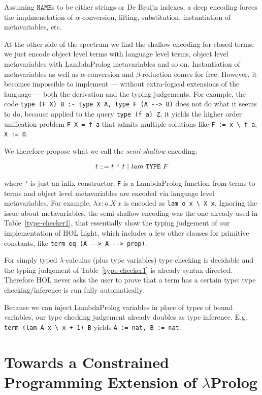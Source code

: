 \documentclass[preprint]{sigplanconf}
\begin{document}
Assuming $\mathtt{NAME}$s to be either strings or De Bruijn indexes, a deep encoding forces the implmenetation of $\alpha$-conversion, lifting, substitution, instantiation of metavariables, etc.

At the other side of the spectrum we find the shallow encoding for closed terms: we just encode object level terms with language level terms, object level metavariables with LambdaProlog metavariables and so on. Instantiation of metavariables as well as $\alpha$-conversion and $\beta$-reduction comes for free. However, it becomes impossible to implement --- without extra-logical extensions of the language --- both the derivation and the typing judgements. For example, the code
\verb+type (F X) B :- type X A, type F (A --> B)+ does not do what it seems to
do, because applied to the query \verb+type (f a) Z+, it yields the higher order
unification problem \verb+F X = f a+ that admits multiple solutions like
\verb+F := x \ f a+, \verb+X := 0+.

We therefore propose what we call the \emph{semi-shallow} encoding:

$$t ::= t~\verb+'+~t ~|~ lam~\mathtt{TYPE}~F$$

where \verb+'+ is just an infix constructor, \verb+F+ is a LambdaProlog function from terms to terms and object level metavariables are encoded via language level metavariables. For example, $\lambda x\!:\!o. X~x$ is encoded as
\verb+lam o x \ X x+. Ignoring the issue about metavariables, the semi-shallow encoding was the one already used in Table~\ref{type-checker1}, that essentially show the typing judgement of our implementation of HOL Light, which includes a few other clauses for primitive constants, like \verb+term eq (A --> A --> prop)+.

For simply typed $\lambda$-calculus (plus type variables) type checking is decidable and the typing judgement of Table~\ref{type-checker1} is already syntax directed. Therefore HOL never asks the user to prove that a term has a certain type: type checking/inference is run fully automatically.

Because we can inject LambdaProlog variables in place of types of bound variables, our type checking judgement already doubles as type inference. E.g. \verb/term (lam A x \ x + 1) B/ yields \verb+A := nat, B := nat+.

\section{Towards a Constrained Programming Extension of $\lambda$Prolog}
\label{cholp}
\end{document}
